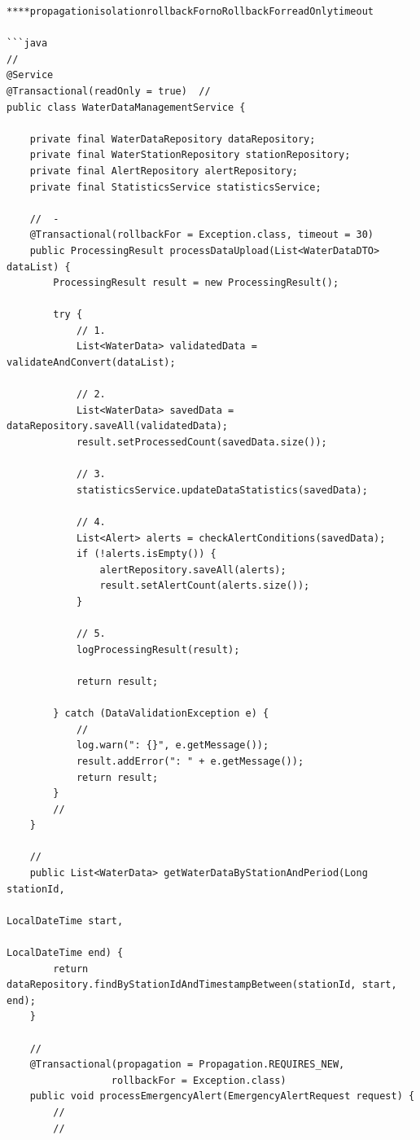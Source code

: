 \begin{verbatim}
****propagationisolationrollbackFornoRollbackForreadOnlytimeout

```java
// 
@Service
@Transactional(readOnly = true)  // 
public class WaterDataManagementService {
    
    private final WaterDataRepository dataRepository;
    private final WaterStationRepository stationRepository;
    private final AlertRepository alertRepository;
    private final StatisticsService statisticsService;
    
    //  - 
    @Transactional(rollbackFor = Exception.class, timeout = 30)
    public ProcessingResult processDataUpload(List<WaterDataDTO> dataList) {
        ProcessingResult result = new ProcessingResult();
        
        try {
            // 1. 
            List<WaterData> validatedData = validateAndConvert(dataList);
            
            // 2. 
            List<WaterData> savedData = dataRepository.saveAll(validatedData);
            result.setProcessedCount(savedData.size());
            
            // 3. 
            statisticsService.updateDataStatistics(savedData);
            
            // 4. 
            List<Alert> alerts = checkAlertConditions(savedData);
            if (!alerts.isEmpty()) {
                alertRepository.saveAll(alerts);
                result.setAlertCount(alerts.size());
            }
            
            // 5. 
            logProcessingResult(result);
            
            return result;
            
        } catch (DataValidationException e) {
            // 
            log.warn(": {}", e.getMessage());
            result.addError(": " + e.getMessage());
            return result;
        }
        // 
    }
    
    // 
    public List<WaterData> getWaterDataByStationAndPeriod(Long stationId, 
                                                          LocalDateTime start, 
                                                          LocalDateTime end) {
        return dataRepository.findByStationIdAndTimestampBetween(stationId, start, end);
    }
    
    // 
    @Transactional(propagation = Propagation.REQUIRES_NEW, 
                  rollbackFor = Exception.class)
    public void processEmergencyAlert(EmergencyAlertRequest request) {
        // 
        // 
        

\end{verbatim}
